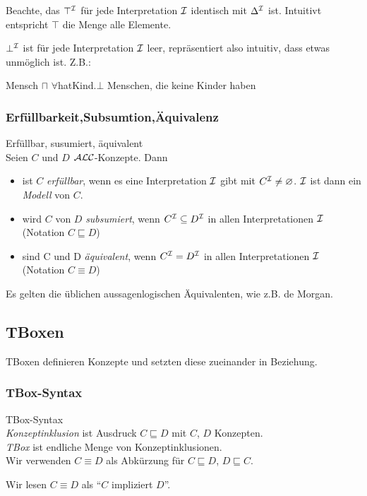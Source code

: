 Beachte, das $\top^{\mathcal{I}}$ für jede Interpretation $\mathcal{I}$ identisch mit $\Delta^{\mathcal{I}}$ ist. Intuitivt entspricht $\top$ die Menge alle Elemente. 

$\bot^{\mathcal{I}}$ ist für jede Interpretation $\mathcal{I}$ leer, repräsentiert also intuitiv, dass etwas unmöglich ist. Z.B.:

Mensch $\sqcap$ $\forall$hatKind.$\bot$
Menschen, die keine Kinder haben

{\subsubsection{Erfüllbarkeit,Subsumtion,Äquivalenz}\label{erfuxfcllbarkeit-subsumtion-uxe4quivalenz}}

\begin{definition}{Erfüllbar, susumiert, äquivalent} \\
Seien $C$ und $D$ $\mathcal{A}\mathcal{L}\mathcal{C}$-Konzepte. Dann

\begin{itemize}
\item
  ist $C$ \emph{erfüllbar}, wenn es eine Interpretation $\mathcal{I}$ gibt mit
  $C^{\mathcal{I}} \neq \varnothing$. $\mathcal{I}$ ist dann ein \emph{Modell} von
  $C$.
\item
  wird $C$ von $D$ \emph{subsumiert}, wenn $C^{\mathcal{I}} \subseteq D^{\mathcal{I}}$
  in allen Interpretationen $\mathcal{I}$ (Notation $C \sqsubseteq D$)
\item
  sind C und D \emph{äquivalent}, wenn $C^{\mathcal{I}} = D^{\mathcal{I}}$ in allen
  Interpretationen $\mathcal{I}$ (Notation $C \equiv D$)
\end{itemize}
\end{definition}

Es gelten die üblichen aussagenlogischen Äquivalenten, wie z.B. de
Morgan.

\subsection{TBoxen}\label{tboxen}

TBoxen definieren Konzepte und setzten diese zueinander in Beziehung.

\subsubsection{TBox-Syntax}\label{tboxsyntax}

\begin{definition}{TBox-Syntax} \\
\emph{Konzeptinklusion} ist Ausdruck $C \sqsubseteq D$ mit $C$, $D$ Konzepten. \\
\emph{TBox} ist endliche Menge von Konzeptinklusionen. \\
Wir verwenden $C \equiv D$ als Abkürzung für $C \sqsubseteq D$, $D \sqsubseteq C$. 

Wir lesen $C \equiv D$ als ``$C$ impliziert $D$''.
\end{definition}

